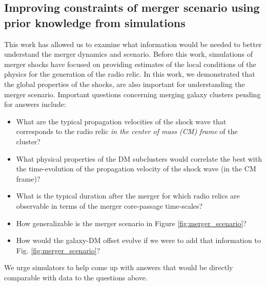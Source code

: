%
\subsection{Improving constraints of merger scenario using prior knowledge from simulations}
This work has allowed us to examine
what information would be needed to better understand the merger
dynamics and scenario. Before this work, simulations of merger shocks have
focused on providing estimates of the local conditions of the physics for
the generation of the radio relic. In this work, we demonstrated that the global
properties of the shocks, are also important for understanding the merger scenario. 
Important questions concerning merging galaxy
clusters pending for answers include:  
\begin{itemize}
\item What are the typical propagation velocities of the shock wave that
	corresponds to the radio relic {\it in the center of mass (CM) frame} of the cluster?
\item What physical properties of the DM subclusters would correlate the
	best with the time-evolution of the propagation velocity of the shock
	wave (in the CM frame)?  
\item What is the typical duration
after the merger for which radio relics are observable in terms of the merger
core-passage time-scales? 
\item How generalizable is the merger scenario in Figure
	\ref{fig:merger_scenario}?  
\item How would the galaxy-DM offset evolve if we were to add that information
	to Fig. \ref{fig:merger_scenario}?
\end{itemize}
We urge simulators to help come up with answers that would be directly
comparable with data to the questions above.  
